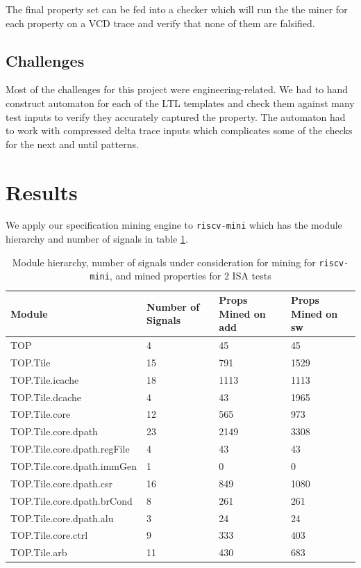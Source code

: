 \documentclass[acmlarge,11pt]{acmart}
\begin{document}
The final property set can be fed into a checker which will run the the miner for each property on a VCD trace and verify that none of them are falsified.

\subsection{Challenges}
Most of the challenges for this project were engineering-related.
We had to hand construct automaton for each of the LTL templates and check them against many test inputs to verify they accurately captured the property.
The automaton had to work with compressed delta trace inputs which complicates some of the checks for the next and until patterns.

\section{Results}
We apply our specification mining engine to \texttt{riscv-mini} which has the module hierarchy and number of signals in table \ref{tab:riscv-mini}.
\begin{table}
  \caption{Module hierarchy, number of signals under consideration for mining for \texttt{riscv-mini}, and mined properties for 2 ISA tests}
  \label{tab:riscv-mini}
  \begin{tabular}{llll}
    \toprule
    Module & Number of Signals & Props Mined on add & Props Mined on sw\\
    \midrule
    TOP & 4 & 45 & 45 \\
    TOP.Tile & 15 & 791 & 1529 \\
    TOP.Tile.icache & 18 & 1113 & 1113 \\
    TOP.Tile.dcache & 4 & 43 & 1965 \\
    TOP.Tile.core & 12 & 565 & 973 \\
    TOP.Tile.core.dpath & 23 & 2149 & 3308 \\
    TOP.Tile.core.dpath.regFile & 4 & 43 & 43\\
    TOP.Tile.core.dpath.immGen & 1 & 0 & 0 \\
    TOP.Tile.core.dpath.csr & 16 & 849 & 1080 \\
    TOP.Tile.core.dpath.brCond & 8 & 261 & 261\\
    TOP.Tile.core.dpath.alu & 3 & 24 & 24 \\
    TOP.Tile.core.ctrl & 9 & 333 & 403 \\
    TOP.Tile.arb & 11 & 430 & 683 \\
  \bottomrule
  \end{tabular}
\end{table}
\end{document}
